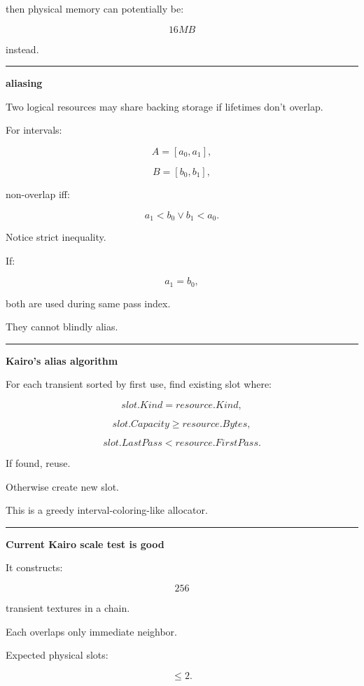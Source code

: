 then physical memory can potentially be:

\[
\boxed{16MB}
\]

instead.

\begin{center}\rule{0.5\linewidth}{0.5pt}\end{center}

\textbf{aliasing}

Two logical resources may share backing storage if lifetimes don't overlap.

For intervals:

\[
A=[a_0,a_1],
\]

\[
B=[b_0,b_1],
\]

non-overlap iff:

\[
\boxed{
a_1<b_0
\lor
b_1<a_0.
}
\]

Notice strict inequality.

If:

\[
a_1=b_0,
\]

both are used during same pass index.

They cannot blindly alias.

\begin{center}\rule{0.5\linewidth}{0.5pt}\end{center}

\textbf{Kairo's alias algorithm}

For each transient sorted by first use, find existing slot where:

\[
slot.Kind=resource.Kind,
\]

\[
slot.Capacity\ge resource.Bytes,
\]

\[
slot.LastPass<resource.FirstPass.
\]

If found, reuse.

Otherwise create new slot.

This is a greedy interval-coloring-like allocator.

\begin{center}\rule{0.5\linewidth}{0.5pt}\end{center}

\textbf{Current Kairo scale test is good}

It constructs:

\[
256
\]

transient textures in a chain.

Each overlaps only immediate neighbor.

Expected physical slots:

\[
\le2.
\]

